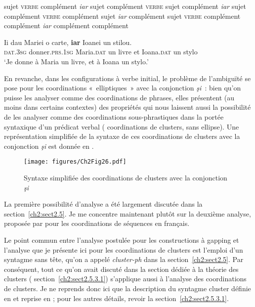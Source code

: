  
\ea \label{ch2:ex320}
\ea sujet \textsc{verbe} complément \textit{iar} sujet complément \label{ch2:ex320a} 
\ex \textsc{verbe} sujet complément \textit{iar} sujet complément \label{ch2:ex320b}
\ex \textsc{verbe} complément sujet \textit{iar} complément sujet \label{ch2:ex320c}
\ex \textsc{verbe} complément complément \textit{iar} complément complément \label{ch2:ex320d}
\z
\z


\ea \label{ch2:ex321}
\gll Ii  dau  Mariei  o  carte,  \textbf{iar}  Ioanei  un  stilou.\\
\textsc{dat.3sg} donner.\textsc{prs.1sg}  Maria.\textsc{dat}  un  livre  et  Ioana.\textsc{dat}  un  stylo\\
\glt ‘Je donne à Maria un livre, et à Ioana un stylo.’
\z



En revanche, dans les configurations à verbe initial, le problème de l’ambiguïté se pose pour les coordinations «~elliptiques~» avec la conjonction \textit{şi~}: bien qu’on puisse les analyser comme des coordinations de phrases, elles présentent (au moins dans certains contextes) des propriétés qui nous laissent aussi la possibilité de les analyser comme des coordinations sous-phrastiques dans la portée syntaxique d’un prédicat verbal ({\cad} coordinations de clusters, sans ellipse). Une représentation simplifiée de la syntaxe de ces coordinations de clusters avec la conjonction \textit{şi} est donnée en . 

\begin{figure} 

\texttt{[image: figures/Ch2Fig26.pdf]}%

\caption{Syntaxe simplifiée des coordinations de clusters avec la conjonction \textit{şi}}
\label{ch2:fig26}
\end{figure}

\largerpage
La première possibilité d’analyse a été largement discutée dans la section~\ref{ch2:sect2.5}. Je me concentre maintenant plutôt sur la deuxième analyse, proposée par \citet{Mouret2006,Mouret2007} pour les coordinations de séquences en français.

Le point commun entre l’analyse postulée pour les constructions à gapping et l’analyse que je présente ici pour les coordinations de clusters est l’emploi d’un syntagme sans tête, qu’on a appelé \textit{cluster-ph} dans la section~\ref{ch2:sect2.5}. Par conséquent, tout ce qu’on avait discuté dans la section dédiée à la théorie des clusters ({{\cad}} section~\ref{ch2:sect2.5.3.1}) s’applique aussi à l’analyse des coordinations de clusters. Je ne reprends donc ici que la description du syntagme cluster définie en  et reprise en  ; pour les autres détails, revoir la section~\ref{ch2:sect2.5.3.1}. 

